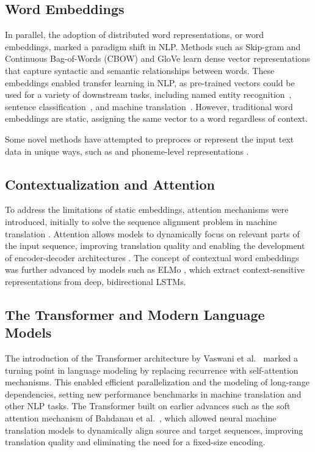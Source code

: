 \subsection{Word Embeddings}
In parallel, the adoption of distributed word representations, or word embeddings, marked a paradigm shift in NLP. Methods such as Skip-gram and Continuous Bag-of-Words (CBOW) \citep{mikolov2013efficient, mikolov2013distributed} and GloVe \citep{pennington2014glove} learn dense vector representations that capture syntactic and semantic relationships between words. These embeddings enabled transfer learning in NLP, as pre-trained vectors could be used for a variety of downstream tasks, including named entity recognition~\citep{lample2016neural}, sentence classification~\citep{kim2014convolutional}, and machine translation~\citep{qi2018translation}. However, traditional word embeddings are static, assigning the same vector to a word regardless of context.

Some novel methods have attempted to preproces or represent the input text data in unique ways, such as \cite{kim2016character} and phoneme-level representations \cite{goriely2024babble}.

\subsection{Contextualization and Attention}
To address the limitations of static embeddings, attention mechanisms were introduced, initially to solve the sequence alignment problem in machine translation \citep{bahdanau2015neural,luong2015effective}. Attention allows models to dynamically focus on relevant parts of the input sequence, improving translation quality and enabling the development of encoder-decoder architectures \citep{sutskever2014sequence}. The concept of contextual word embeddings was further advanced by models such as ELMo \citep{peters2018deep}, which extract context-sensitive representations from deep, bidirectional LSTMs.

\subsection{The Transformer and Modern Language Models}
The introduction of the Transformer architecture by Vaswani et al.~\citep{vaswani2017attention} marked a turning point in language modeling by replacing recurrence with self-attention mechanisms. This enabled efficient parallelization and the modeling of long-range dependencies, setting new performance benchmarks in machine translation and other NLP tasks. The Transformer built on earlier advances such as the soft attention mechanism of Bahdanau et al.~\citep{bahdanau2015neural}, which allowed neural machine translation models to dynamically align source and target sequences, improving translation quality and eliminating the need for a fixed-size encoding.

